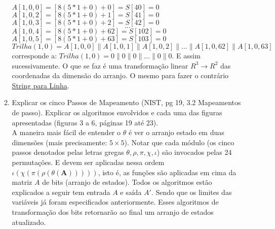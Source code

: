 \documentclass[12pt, a4paper]{article}
\begin{document}
\begin{enumerate}
\begin{enumerate}
$A[1, 0, 0] = [8(5*1+0)+0] = S[40] = 0$\\
$A[1, 0, 2] = [8(5*1+0)+1] = S[41] = 0$\\
$A[1, 0, 3] = [8(5*1+0)+2] = S[42] = 0$\\
$$\ldots$$
$A[1, 0, 4] = [8(5*1+0)+62] = S[102] = 0$\\
$A[1, 0, 5] = [8(5*1+0)+63] = S[103] = 0$\\

$Trilha (1, 0) = A[1, 0, 0] \parallel A[1, 0, 1] \parallel A[1, 0, 2] \parallel
\ldots \parallel A[1, 0, 62] \parallel A[1, 0, 63]$ corresponde a: $Trilha (1,
0) = 0 \parallel 0 \parallel 0 \parallel \ldots \parallel 0 \parallel 0$. E
assim sucessivamente. O que se faz é uma transformação linear $R^3 \rightarrow
R^2$ das coordenadas da dimensão do arranjo. O mesmo para fazer o contrário
\underline{String para Linha}.\\

\item Explicar os cinco Passos de Mapeamento (NIST, pg 19, 3.2 Mapeamentos de
passo). Explicar os algoritmos envolvidos e cada uma das figuras apresentadas
(figuras 3 a 6, páginas 19 até 23).\\

A maneira mais fácil de entender o $\theta$ é ver o arranjo estado em duas
dimensões (mais precisamente: $5 \times 5$). Notar que cada módulo (os cinco
passos denotados pelas letras gregas $\theta, \rho, \pi, \chi, \iota$) são
invocados pelas 24 permutações. E devem ser aplicadas nessa ordem
$\iota(\chi(\pi(\rho(\theta(\textbf{A})))))$, isto é, as funções são aplicadas
em cima da matriz $A$ de bits (arranjo de estados). Todos os algoritmos estão
explicados a seguir tem entrada $A$ e saída $A'$. Sendo que os limites das
variáveis já foram especificados anteriormente. Esses algoritmos de
transformação dos bits retornarão ao final um arranjo de estados atualizado.\\


\end{enumerate}
\end{enumerate}
\end{document}
